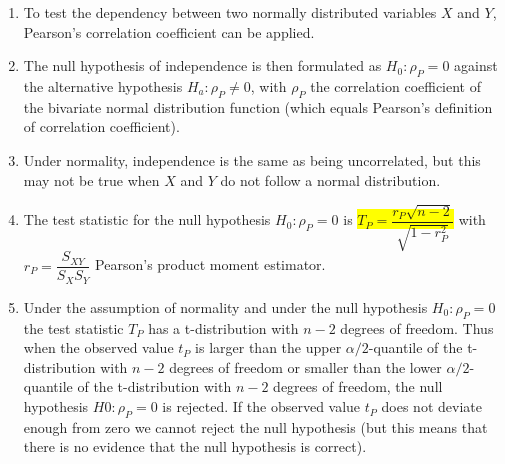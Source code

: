 \begin{enumerate}
    \item To test the dependency between two normally distributed variables $X$ and $Y $, Pearson’s correlation coefficient can be applied.
    \hfill \cite{statistics/book/Statistics-for-Data-Scientists/Maurits-Kaptein}

    \item The null hypothesis of independence is then formulated as $H_0 : \rho_P = 0$ against the alternative hypothesis $H_a : \rho_P \neq 0$, with $\rho_P$ the correlation coefficient of the bivariate normal distribution function (which equals Pearson’s definition of correlation coefficient).
    \hfill \cite{statistics/book/Statistics-for-Data-Scientists/Maurits-Kaptein}

    \item Under normality, independence is the same as being uncorrelated, but this may not be true when $X$ and $Y$ do not follow a normal distribution.
    \hfill \cite{statistics/book/Statistics-for-Data-Scientists/Maurits-Kaptein}

    \item The test statistic for the null hypothesis $H_0 : \rho_P = 0$ is \colorbox{yellow}{$T _P = \dfrac{r _P \sqrt{n - 2}}{\sqrt{1 - r^2_P}}$} with $r_ P = \dfrac{S _{X Y}}{S_ X S_Y}$ Pearson’s product moment estimator.
    \hfill \cite{statistics/book/Statistics-for-Data-Scientists/Maurits-Kaptein}

    \item Under the assumption of normality and under the null hypothesis $H_0 : \rho_P = 0$ the test statistic $T _P$ has a t-distribution with $n - 2$ degrees of freedom. 
    Thus when the observed value $t _P$ is larger than the upper $\alpha/2$-quantile of the t-distribution with $n - 2$ degrees of freedom or smaller than the lower $\alpha/2$-quantile of the t-distribution with $n - 2$ degrees of freedom, the null hypothesis $H0 : \rho_P = 0$ is rejected. 
    If the observed value $t _P$ does not deviate enough from zero we cannot reject the null hypothesis (but this means that there is no evidence that the null hypothesis is correct).
    \hfill \cite{statistics/book/Statistics-for-Data-Scientists/Maurits-Kaptein}


\end{enumerate}
